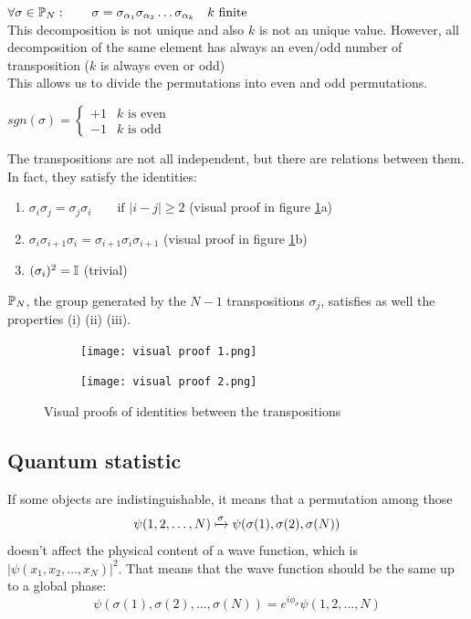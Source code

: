 \Th $\forall \sigma \in \mathbb{P}_N:\qquad \sigma = \sigma_{\alpha_1}\sigma_{\alpha_2} \dots \sigma_{\alpha_k} \quad k \text{ finite}$\\
This decomposition is not unique and also $k$ is not an unique value. However, all decomposition of the same element has always an even/odd number of transposition ($k$ is always even or odd)\\

This allows us to divide the permutations into even and odd permutations.

\Def $sgn (\sigma) = \begin{cases} +1 & k \text{ is even} \\ -1 & k \text{ is odd}\end{cases}$

The transpositions are not all independent, but there are relations between them. In fact, they satisfy the identities:
\begin{enumerate}[label=\roman*.]
    \item $\sigma_i\sigma_j = \sigma_j\sigma_i \qquad \text{if }|i-j| \ge 2$ \qquad (visual proof in figure \ref{fig:visual-proof}a)
    \item $\sigma_i\sigma_{i+1}\sigma_i = \sigma_{i+1}\sigma_i\sigma_{i+1}$ \qquad (visual proof in figure \ref{fig:visual-proof}b)
    \item $(\sigma_i)^2 = \mathbb{I}$ \qquad (trivial)
\end{enumerate}

$\mathbb{P}_N$, the group generated by the $N-1$ transpositions $\sigma_j$, satisfies as well the properties (i) (ii) (iii).\\

\begin{figure}[ht]
    \centering
    \begin{subfigure}[b]{0.48\textwidth}
        \centering
        \texttt{[image: visual proof 1.png]}
    \end{subfigure}
    \begin{subfigure}[b]{0.48\textwidth}
        \centering
        \texttt{[image: visual proof 2.png]}
    \end{subfigure}
    \caption{Visual proofs of identities between the transpositions}
    \label{fig:visual-proof}
\end{figure}

\subsection{Quantum statistic}
If some objects are indistinguishable, it means that a permutation among those $$\psi(1,2,\dots, N) \xmapsto{\sigma}\psi(\sigma(1), \sigma(2), \sigma(N))$$ doesn't affect the physical content of a wave function, which is $|\psi(x_1, x_2, \dots, x_N)|^2$. That means that the wave function should be the same up to a global phase:
$$\psi(\sigma(1), \sigma(2), \dots,\sigma(N)) = e^{i\phi_\sigma}\psi(1, 2, \dots, N)$$

